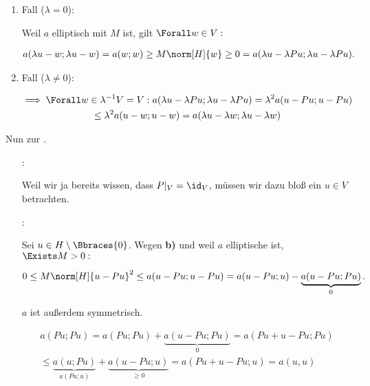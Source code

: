 \begin{solution}
\begin{enumerate}[label = \textbf{\alph*)}]
\begin{itemize}
    \begin{enumerate}[label = \arabic*.]

      \item Fall ($\lambda = 0$):
      
      Weil $a$ elliptisch mit $M$ ist, gilt $\Forall w \in V:$

      \begin{align*}
        a(\lambda u - w; \lambda u - w)
        =
        a(w; w)
        \geq
        M \norm[H]{w}
        \geq
        0 = a(\lambda u - \lambda Pu; \lambda u - \lambda Pu).
      \end{align*}

      \item Fall ($\lambda \neq 0$):

      \begin{multline*}
        \implies
        \Forall w \in \lambda^{-1} V = V:
        a(\lambda u - \lambda Pu;\lambda u - \lambda Pu)
        =
        \lambda^2 a(u - Pu;u - Pu) \\
        \leq
        \lambda^2 a(u - w; u - w)
        =
        a(\lambda u - \lambda w; \lambda u - \lambda w)
      \end{multline*}
    
    \end{enumerate}

\end{itemize}

  Nun zur .

  \begin{itemize}

    \item
    [\Quote{$\geq$}:]

    Weil wir ja bereits wissen, dass $P|_V = \id_V$, müssen wir dazu bloß ein $u \in V$ betrachten.

    \item
    [\Quote{$\leq$}:]

    Sei $u \in H \setminus \Bbraces{0}$.
    Wegen \textbf{b)} und weil $a$ elliptische ist, $\Exists M > 0:$

    \begin{align*}
      0 \leq M \norm[H]{u - Pu}^2
      \leq
      a(u - Pu; u - Pu)
      =
      a(u - Pu; u)
      -
      \underbrace{a(u - Pu; Pu)}_0.
    \end{align*}

    $a$ ist außerdem symmetrisch.

    \begin{multline*}
      a(Pu; Pu)
      =
      a(Pu; Pu)
      +
      \underbrace{a(u - Pu; Pu)}_0
      =
      a(Pu + u - Pu; Pu) \\
      \leq
      \underbrace{a(u; Pu)}_{a(Pu; u)}
      +
      \underbrace{a(u - Pu; u)}_{\geq 0}
      =
      a(Pu + u - Pu; u)
      =
      a(u, u)
    \end{multline*}

  \end{itemize}

\end{enumerate}

\end{solution}

